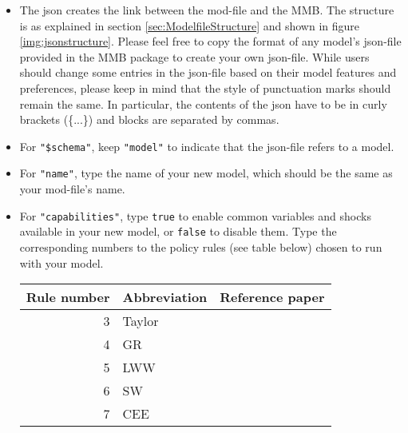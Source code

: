 \begin{itemize}
\item The json creates the link between the mod-file and the MMB. The structure is as explained in section \ref{sec:ModelfileStructure} and shown in figure \ref{img:jsonstructure}. 
Please feel free to copy the format of any model's json-file provided in the MMB package to create your own json-file. While users should change some entries in the json-file based on their model features and preferences, please keep in mind that the style of punctuation marks should remain the same.
In particular, the contents of the json have to be in curly brackets (\{...\}) and blocks are separated by commas.
\item For \texttt{"\$schema"}, keep \texttt{"model"} to indicate that the json-file refers to a model.
\item For \texttt{"name"}, type the name of your new model, which should be the same as your mod-file's name.
\item For \texttt{"capabilities"}, type \texttt{true} to enable common variables and shocks available in your new model, or \texttt{false} to disable them.
Type the corresponding numbers to the policy rules (see table below) chosen to run with your model. 
	\begin{table}[H]
	\centering
	\begin{tabular}{rll}
		Rule number & Abbreviation & Reference paper\\
		\hline
		 3 & Taylor & \cite{Taylor1993}\\
		 4 & GR & \cite{GerdesmeierRoffia2004}\\
		 5 & LWW & \cite{LevinWielandWilliams2003}\\
		 6 & SW & \cite{SmetsWouters2007}\\
		 7 &  CEE & \cite{ChristianoEichenbaumEvans2005}\\

\end{tabular}
\end{table}
\end{itemize}
